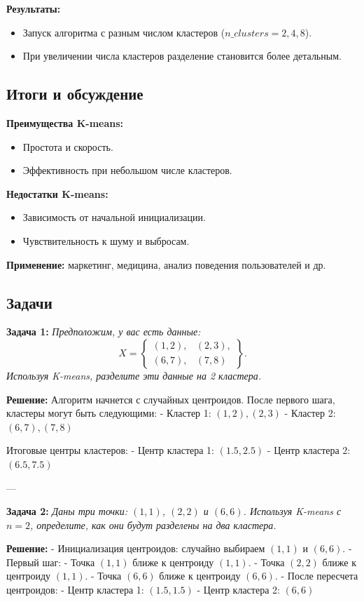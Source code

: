 \textbf{Результаты:}
\begin{itemize}
    \item Запуск алгоритма с разным числом кластеров ($n\_clusters = 2, 4, 8$).
    \item При увеличении числа кластеров разделение становится более детальным.
\end{itemize}

\subsection*{Итоги и обсуждение}
\textbf{Преимущества K-means:}
\begin{itemize}
    \item Простота и скорость.
    \item Эффективность при небольшом числе кластеров.
\end{itemize}
\textbf{Недостатки K-means:}
\begin{itemize}
    \item Зависимость от начальной инициализации.
    \item Чувствительность к шуму и выбросам.
\end{itemize}
\textbf{Применение:} маркетинг, медицина, анализ поведения пользователей и др.



\subsection*{Задачи}

\textbf{Задача 1:} \textit{Предположим, у вас есть данные:} 
\[
X = \left\{
\begin{array}{cc}
(1, 2), & (2, 3), \\
(6, 7), & (7, 8)
\end{array}
\right\}.
\]
\textit{Используя K-means, разделите эти данные на 2 кластера.}

\textbf{Решение:}  
Алгоритм начнется с случайных центроидов. После первого шага, кластеры могут быть следующими:
- Кластер 1: $(1, 2), (2, 3)$
- Кластер 2: $(6, 7), (7, 8)$

Итоговые центры кластеров:
- Центр кластера 1: $(1.5, 2.5)$
- Центр кластера 2: $(6.5, 7.5)$

---

\textbf{Задача 2:} \textit{Даны три точки: $(1, 1)$, $(2, 2)$ и $(6, 6)$. Используя K-means с $n=2$, определите, как они будут разделены на два кластера.}

\textbf{Решение:}  
- Инициализация центроидов: случайно выбираем $(1, 1)$ и $(6, 6)$.
- Первый шаг:
  - Точка $(1, 1)$ ближе к центроиду $(1, 1)$.
  - Точка $(2, 2)$ ближе к центроиду $(1, 1)$.
  - Точка $(6, 6)$ ближе к центроиду $(6, 6)$.
- После пересчета центроидов:
  - Центр кластера 1: $(1.5, 1.5)$
  - Центр кластера 2: $(6, 6)$
  
